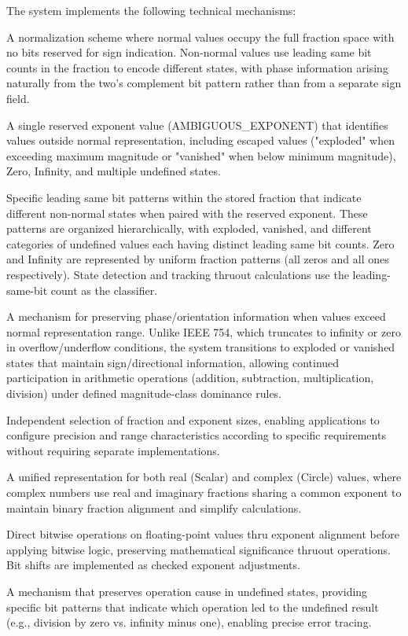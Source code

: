 \documentclass[12pt,letter]{article}
\begin{document}
The system implements the following technical mechanisms:

A normalization scheme where normal values occupy the full fraction space with no bits reserved for sign indication. Non-normal values use leading same bit counts in the fraction to encode different states, with phase information arising naturally from the two's complement bit pattern rather than from a separate sign field.

A single reserved exponent value (AMBIGUOUS\_EXPONENT) that identifies values outside normal representation, including escaped values ("exploded" when exceeding maximum magnitude or "vanished" when below minimum magnitude), Zero, Infinity, and multiple undefined states.

Specific leading same bit patterns within the stored fraction that indicate different non-normal states when paired with the reserved exponent. These patterns are organized hierarchically, with exploded, vanished, and different categories of undefined values each having distinct leading same bit counts. Zero and Infinity are represented by uniform fraction patterns (all zeros and all ones respectively). State detection and tracking thruout calculations use the leading-same-bit count as the classifier.

A mechanism for preserving phase/orientation information when values exceed normal representation range. Unlike IEEE 754, which truncates to infinity or zero in overflow/underflow conditions, the system transitions to exploded or vanished states that maintain sign/directional information, allowing continued participation in arithmetic operations (addition, subtraction, multiplication, division) under defined magnitude-class dominance rules.

Independent selection of fraction and exponent sizes, enabling applications to configure precision and range characteristics according to specific requirements without requiring separate implementations.

A unified representation for both real (Scalar) and complex (Circle) values, where complex numbers use real and imaginary fractions sharing a common exponent to maintain binary fraction alignment and simplify calculations.

Direct bitwise operations on floating-point values thru exponent alignment before applying bitwise logic, preserving mathematical significance thruout operations. Bit shifts are implemented as checked exponent adjustments.

A mechanism that preserves operation cause in undefined states, providing specific bit patterns that indicate which operation led to the undefined result (e.g., division by zero vs. infinity minus one), enabling precise error tracing.
\end{document}
